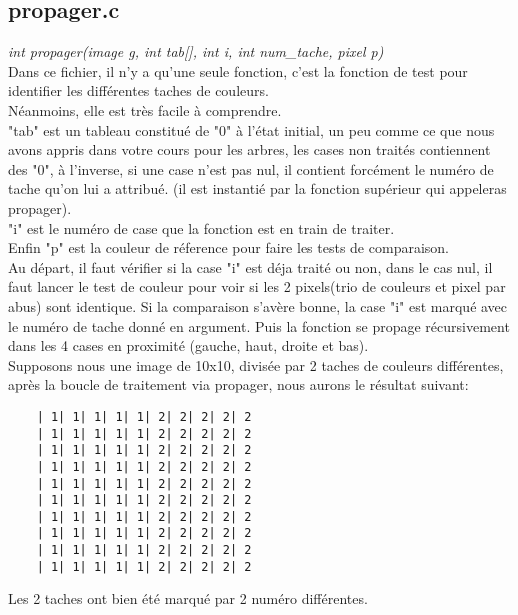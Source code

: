 \documentclass[12pt, letterpaper]{article}
\begin{document}
\subsection{propager.c}
\textit{int propager(image g, int tab[], int i, int num\_tache, pixel p)}\\
Dans ce fichier, il n'y a qu'une seule fonction, c'est la fonction de test pour identifier les différentes 
taches de couleurs.\\
Néanmoins, elle est très facile à comprendre.\\
"tab" est un tableau constitué de "0" à l'état initial, un peu comme ce que nous avons appris dans votre cours 
pour les arbres, les cases non traités contiennent des "0", à l'inverse, si une case n'est pas nul, 
il contient forcément le numéro de tache qu'on lui a attribué. (il est instantié par la fonction supérieur qui appeleras propager).\\
"i" est le numéro de case que la fonction est en train de traiter.\\
Enfin "p" est la couleur de réference pour faire les tests de comparaison.\\
Au départ, il faut vérifier si la case "i" est déja traité ou non, dans le cas nul, 
il faut lancer le test de couleur pour voir si les 2 pixels(trio de couleurs et pixel par abus) sont identique.
Si la comparaison s'avère bonne, la case "i" est marqué avec le numéro de tache donné en argument.
Puis la fonction se propage récursivement dans les 4 cases en proximité (gauche, haut, droite et bas).
\\
Supposons nous une image de 10x10, divisée par 2 taches de couleurs différentes, 
après la boucle de traitement via propager, nous aurons le résultat suivant:
\begin{lstlisting}
    | 1| 1| 1| 1| 1| 2| 2| 2| 2| 2
    | 1| 1| 1| 1| 1| 2| 2| 2| 2| 2
    | 1| 1| 1| 1| 1| 2| 2| 2| 2| 2
    | 1| 1| 1| 1| 1| 2| 2| 2| 2| 2
    | 1| 1| 1| 1| 1| 2| 2| 2| 2| 2
    | 1| 1| 1| 1| 1| 2| 2| 2| 2| 2
    | 1| 1| 1| 1| 1| 2| 2| 2| 2| 2
    | 1| 1| 1| 1| 1| 2| 2| 2| 2| 2
    | 1| 1| 1| 1| 1| 2| 2| 2| 2| 2
    | 1| 1| 1| 1| 1| 2| 2| 2| 2| 2
\end{lstlisting}
Les 2 taches ont bien été marqué par 2 numéro différentes.
\end{document}
